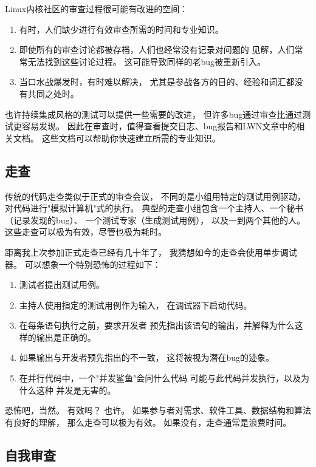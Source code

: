 Linux内核社区的审查过程很可能有改进的空间：

\begin{enumerate}
\item	有时，人们缺少进行有效审查所需的时间和专业知识。
\item	即使所有的审查讨论都被存档，人们也经常没有记录对问题的
	见解，人们常常无法找到这些讨论过程。
	这可能导致同样的老bug被重新引入。
\item	当口水战爆发时，有时难以解决，
	尤其是参战各方的目的、经验和词汇都没有共同之处时。
\end{enumerate}

也许持续集成风格的测试可以提供一些需要的改进，
但许多bug通过审查比通过测试更容易发现。
因此在审查时，值得查看提交日志、bug报告和LWN文章中的相关文档。
这些文档可以帮助你快速建立所需的专业知识。

\subsection{走查}
\label{sec:debugging:Walkthroughs}

传统的代码走查类似于正式的审查会议，
不同的是小组用特定的测试用例驱动，
对代码进行"模拟计算机"式的执行。
典型的走查小组包含一个主持人、一个秘书（记录发现的bug）、
一个测试专家（生成测试用例），
以及一到两个其他的人。
这些走查可以极为有效，尽管也极为耗时。

距离我上次参加正式走查已经有几十年了，
我猜想如今的走查会使用单步调试器。
可以想象一个特别恐怖的过程如下：

\begin{enumerate}
\item	测试者提出测试用例。
\item	主持人使用指定的测试用例作为输入，
	在调试器下启动代码。
\item	在每条语句执行之前，要求开发者
	预先指出该语句的输出，并解释为什么这样的输出是正确的。
\item	如果输出与开发者预先指出的不一致，
	这将被视为潜在bug的迹象。
\item	在并行代码中，一个"并发鲨鱼"会问什么代码
	可能与此代码并发执行，以及为什么这种
	并发是无害的。
\end{enumerate}

恐怖吧，当然。
有效吗？
也许。
如果参与者对需求、软件工具、数据结构和算法有良好的理解，
那么走查可以极为有效。
如果没有，走查通常是浪费时间。

\subsection{自我审查}
\label{sec:debugging:Self-Inspection}

